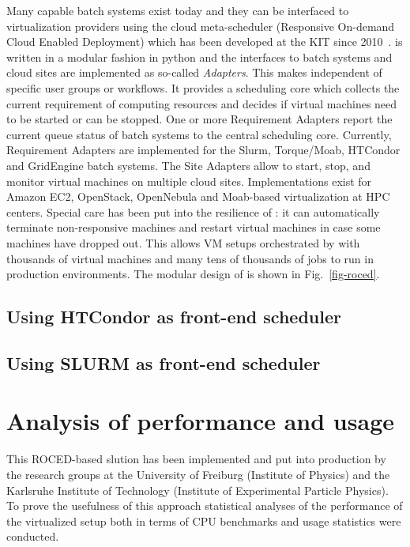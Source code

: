Many capable batch systems exist today and they can be interfaced to virtualization providers using the cloud meta-scheduler \Roced (Responsive On-demand Cloud Enabled Deployment) which has been developed at the KIT since 2010~\cite{ROCED}. \Roced is written in a modular
fashion in python and the interfaces to batch systems and cloud sites
are implemented as so-called \textit{Adapters}. This makes \Roced
independent of specific user groups or workflows. It provides a
scheduling core which collects the current requirement of computing
resources and decides if virtual machines need to be started or can be
stopped. One or more Requirement Adapters report the current queue
status of batch systems to the central scheduling core. Currently,
Requirement Adapters are implemented for the Slurm, Torque/Moab, HTCondor
and GridEngine batch systems. The Site Adapters allow \Roced to start,
stop, and monitor virtual machines on multiple cloud
sites. Implementations exist for Amazon EC2, OpenStack, OpenNebula and
Moab-based virtualization at HPC centers. Special care has been put
into the resilience of \Roced: it can automatically terminate
non-responsive machines and restart virtual machines in case some
machines have dropped out. This allows VM setups orchestrated by \Roced with thousands of virtual machines and many tens of thousands of jobs to run in production environments.
The modular design of \Roced is shown in Fig.~\ref{fig-roced}.

\subsection{Using HTCondor as front-end scheduler}\label{sec:ROCED:HTCondor}


\subsection{Using SLURM as front-end scheduler}



\section{Analysis of performance and usage}

This ROCED-based slution has been implemented and put into production by the research groups at the University of Freiburg (Institute of Physics) and the Karlsruhe Institute of Technology (Institute of Experimental
Particle Physics). To prove the usefulness of this approach statistical analyses of the performance of the virtualized setup both in terms of CPU benchmarks and usage statistics were conducted.


